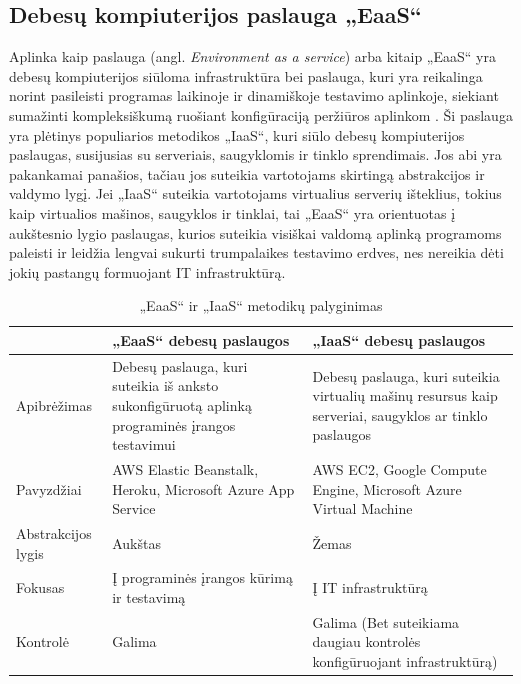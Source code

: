 \documentclass{VUMIFPSkursinis}
\begin{document}
\subsection{Debesų kompiuterijos paslauga „EaaS“}

Aplinka kaip paslauga (angl. \textit{Environment as a service}) arba kitaip 
„EaaS“ yra debesų kompiuterijos siūloma infrastruktūra bei paslauga, kuri yra reikalinga norint pasileisti programas laikinoje ir dinamiškoje testavimo aplinkoje, siekiant sumažinti kompleksiškumą ruošiant konfigūraciją peržiūros aplinkom \cite{SaltTryliktas}. Ši paslauga yra plėtinys populiarios metodikos „IaaS“, kuri siūlo debesų kompiuterijos paslaugas, susijusias su serveriais, saugyklomis ir tinklo sprendimais. Jos abi yra pakankamai panašios, tačiau jos suteikia vartotojams skirtingą abstrakcijos ir valdymo lygį. Jei „IaaS“ suteikia vartotojams virtualius serverių išteklius, tokius kaip virtualios mašinos, saugyklos ir tinklai, tai „EaaS“ yra orientuotas į aukštesnio lygio paslaugas, kurios suteikia visiškai valdomą aplinką programoms paleisti ir leidžia lengvai sukurti trumpalaikes testavimo erdves, nes nereikia dėti jokių pastangų formuojant IT infrastruktūrą. 

\begin{table}[H]\footnotesize
  \centering
  \caption{„EaaS“ ir „IaaS“ metodikų palyginimas}
  {\begin{tabular}{|l|p{55mm}|p{55mm}|} \hline
     & „EaaS“ debesų paslaugos & „IaaS“ debesų paslaugos \\
    \hline
    Apibrėžimas & Debesų paslauga, kuri suteikia iš anksto sukonfigūruotą aplinką programinės įrangos testavimui & Debesų paslauga, kuri suteikia virtualių mašinų resursus kaip serveriai, saugyklos ar tinklo paslaugos      \\
    \hline
    Pavyzdžiai & AWS Elastic Beanstalk, Heroku, Microsoft Azure App Service & AWS EC2, Google Compute Engine, Microsoft Azure Virtual Machine       \\
    \hline
    Abstrakcijos lygis & Aukštas & Žemas       \\
    \hline
    Fokusas  & Į programinės įrangos kūrimą ir testavimą    & Į IT infrastruktūrą \\
    \hline
    Kontrolė  & Galima & Galima (Bet suteikiama daugiau kontrolės konfigūruojant infrastruktūrą) \\
    \hline
  \end{tabular}}
  \label{tab:table example}
\end{table}
\end{document}
